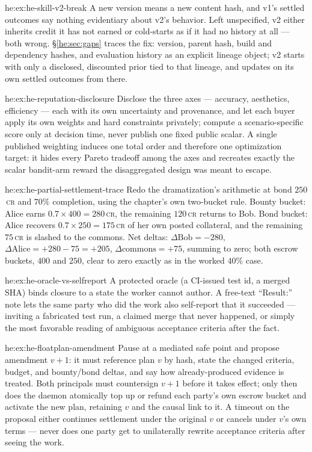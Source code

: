\begin{pdSolution}{he:ex:he-skill-v2-break}
A new version means a new content hash, and v1's settled outcomes say
nothing evidentiary about v2's behavior. Left unspecified, v2 either inherits
credit it has not earned or cold-starts as if it had no history at all --- both
wrong. \S\ref{he:sec:gaps} traces the fix: version, parent hash, build and
dependency hashes, and evaluation history as an explicit lineage object; v2
starts with only a disclosed, discounted prior tied to that lineage, and updates
on its own settled outcomes from there.
\end{pdSolution}
\begin{pdSolution}{he:ex:he-reputation-disclosure}
Disclose the three axes --- accuracy, aesthetics, efficiency --- each with
its own uncertainty and provenance, and let each buyer apply its own weights and
hard constraints privately; compute a scenario-specific score only at decision
time, never publish one fixed public scalar. A single published weighting induces
one total order and therefore one optimization target: it hides every Pareto
tradeoff among the axes and recreates exactly the scalar bandit-arm reward the
disaggregated design was meant to escape.
\end{pdSolution}
\begin{pdSolution}{he:ex:he-partial-settlement-trace}
Redo the dramatization's arithmetic at bond $250$\,\textsc{cr} and $70\%$
completion, using the chapter's own two-bucket rule. Bounty bucket: Alice earns
$0.7\times400=280$\,\textsc{cr}, the remaining $120$\,\textsc{cr} returns to Bob.
Bond bucket: Alice recovers $0.7\times250=175$\,\textsc{cr} of her own posted
collateral, and the remaining $75$\,\textsc{cr} is slashed to the commons. Net
deltas: $\Delta\text{Bob}=-280$, $\Delta\text{Alice}=+280-75=+205$,
$\Delta\text{commons}=+75$, summing to zero; both escrow buckets, $400$ and
$250$, clear to zero exactly as in the worked $40\%$ case.
\end{pdSolution}
\begin{pdSolution}{he:ex:he-oracle-vs-selfreport}
A protected oracle (a CI-issued test id, a merged SHA) binds closure to a
state the worker cannot author. A free-text ``Result:'' note lets the same party
who did the work also self-report that it succeeded --- inviting a fabricated
test run, a claimed merge that never happened, or simply the most favorable
reading of ambiguous acceptance criteria after the fact.
\end{pdSolution}
\begin{pdSolution}{he:ex:he-floatplan-amendment}
Pause at a mediated safe point and propose amendment $v{+}1$: it must
reference plan $v$ by hash, state the changed criteria, budget, and bounty/bond
deltas, and say how already-produced evidence is treated. Both principals must
countersign $v{+}1$ before it takes effect; only then does the daemon atomically
top up or refund each party's own escrow bucket and activate the new plan,
retaining $v$ and the causal link to it. A timeout on the proposal either
continues settlement under the original $v$ or cancels under $v$'s own terms ---
never does one party get to unilaterally rewrite acceptance criteria after seeing
the work.
\end{pdSolution}
